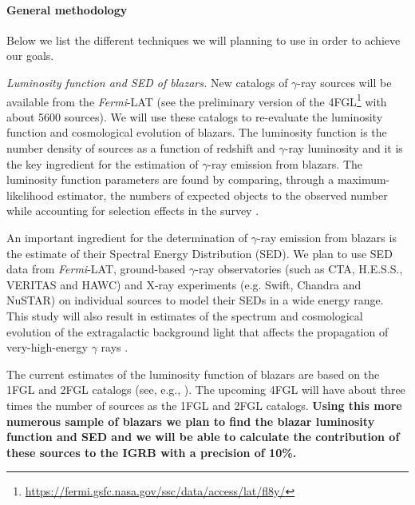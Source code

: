 \documentclass[12 pt]{article}
\newcommand{\FIXME}[1]{{\color{red}{\em Comment: }{#1}}}
\begin{document}
\vspace{-0.5cm}
\paragraph{General methodology} 
\label{sec:methodology}
Below we list the different techniques we will planning to use in order to achieve our goals.  

{\it Luminosity function and SED of blazars.}
New catalogs of $\gamma$-ray sources will be available from the {\it Fermi}-LAT (see the preliminary version of the 4FGL\footnote{\url{https://fermi.gsfc.nasa.gov/ssc/data/access/lat/fl8y/}} with about 5600 sources).
We will use these catalogs to re-evaluate the luminosity function and cosmological evolution of blazars.
The luminosity function is the number density of sources as a function of redshift and $\gamma$-ray luminosity and it is the key ingredient for the estimation of $\gamma$-ray emission from blazars.
The luminosity function parameters are found by comparing, through a maximum-likelihood estimator, the numbers of expected objects to the observed number while accounting for selection effects in the survey \cite{2012ApJ...751..108A}. 

An important ingredient for the determination of $\gamma$-ray emission from blazars is the estimate of their Spectral Energy Distribution (SED).
We plan to use SED data from {\it Fermi}-LAT, ground-based $\gamma$-ray observatories (such as CTA, H.E.S.S., VERITAS and HAWC) and X-ray experiments (e.g. Swift, Chandra and NuSTAR) on individual sources to model their SEDs in a wide energy range.
This study will also result in estimates of the spectrum and cosmological evolution of the extragalactic background light that affects the propagation of very-high-energy $\gamma$ rays \cite{2012Sci...338.1190A}.

The current estimates of the luminosity function of blazars are based on the 1FGL and 2FGL catalogs (see, e.g., \cite{2012ApJ...751..108A,Ajello:2015mfa,DiMauro:2013zfa}).
The upcoming 4FGL will have about three times the number of sources as the 1FGL and 2FGL catalogs.
{\bf Using this more numerous sample of blazars we plan to find the blazar luminosity function and SED and we will be able to calculate the contribution of these sources to the IGRB with a precision of 10\%.}
\end{document}
